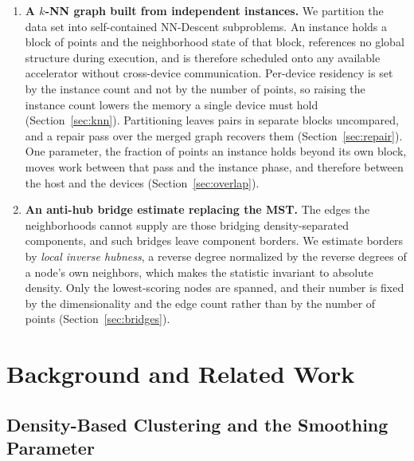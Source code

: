 \documentclass{ieeeaccess}
\begin{document}
\begin{enumerate}
\item \textbf{A $k$-NN graph built from independent instances.} We partition the
      data set into self-contained NN-Descent subproblems. An instance holds a
      block of points and the neighborhood state of that block, references no
      global structure during execution, and is therefore scheduled onto any
      available accelerator without cross-device communication. Per-device
      residency is set by the instance count and not by the number of points,
      so raising the instance count lowers the memory a single device must hold
      (Section~\ref{sec:knn}). Partitioning leaves pairs in separate blocks
      uncompared, and a repair pass over the merged graph recovers them
      (Section~\ref{sec:repair}). One parameter, the fraction of points an
      instance holds beyond its own block, moves work between that pass and the
      instance phase, and therefore between the host and the devices
      (Section~\ref{sec:overlap}).

\item \textbf{An anti-hub bridge estimate replacing the MST.} The edges the
      neighborhoods cannot supply are those bridging density-separated
      components, and such bridges leave component borders. We estimate
      borders by \emph{local inverse hubness}, a reverse degree normalized by the
      reverse degrees of a node's own neighbors, which makes the statistic
      invariant to absolute density. Only the lowest-scoring nodes are spanned,
      and their number is fixed by the dimensionality and the edge count rather
      than by the number of points (Section~\ref{sec:bridges}).
\end{enumerate}

\section{Background and Related Work}

\subsection{Density-Based Clustering and the Smoothing Parameter}
\end{document}
